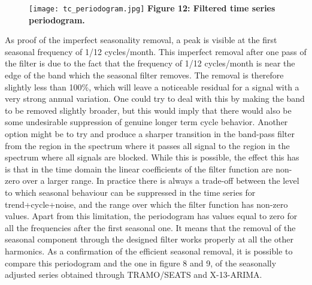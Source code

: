 \documentclass{article}
\begin{document}
\begin{figure}[H]
\centering
  \texttt{[image: tc\_periodogram.jpg]}
  {\textbf{\scriptsize Figure 12: Filtered time series periodogram.}}
  \label{fig:1}
\end{figure}
As proof of the imperfect seasonality removal, a peak is visible at the first seasonal frequency of 1/12 cycles/month. This imperfect removal after one pass of the filter is due to the fact that the frequency of 1/12 cycles/month is near the edge of the band which the seasonal filter removes. The removal is therefore slightly less than 100\%, which will leave a noticeable residual for a signal with a very strong annual variation. One could try to deal with this by making the band to be removed slightly broader, but this would imply that there would also be some undesirable suppression of genuine longer term cycle behavior. Another option might be to try and produce a sharper transition in the band-pass filter from the region in the spectrum where it passes all signal to the region in the spectrum where all signals are blocked. While this is possible, the effect this has is that in the time domain the linear coefficients of the filter function are non-zero over a larger range. In practice there is always a trade-off between the level to which seasonal behaviour can be suppressed in the time series for trend+cycle+noise, and the range over which the filter function has non-zero values. Apart from this limitation, the periodogram has values equal to zero for all the frequencies after the first seasonal one. It means that the removal of the seasonal component through the designed filter works properly at all the other harmonics. As a confirmation of the efficient seasonal removal, it is possible to compare this periodogram and the one in figure 8 and 9, of the seasonally adjusted series obtained through TRAMO/SEATS and X-13-ARIMA.\\
\end{document}
